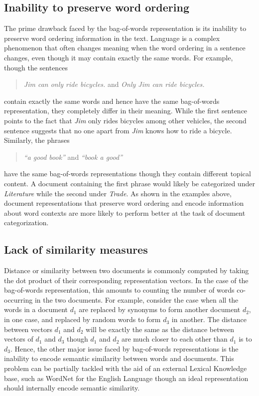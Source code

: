 \subsection{Inability to preserve word ordering}
The prime drawback faced by the bag-of-words representation is its 
inability to preserve word ordering information in the text. Language 
is a complex phenomenon that often changes meaning when the word 
ordering in a sentence changes, even though it may contain exactly the 
same words. For example,  though the sentences
\begin{quote}
\centering
\emph{ 	Jim can only ride bicycles. } and \emph{ 	Only Jim can ride bicycles. }
\end{quote}
contain exactly the same words and hence have the same bag-of-words representation, they completely differ in their meaning. While the first sentence points to the fact that \emph{Jim} only rides bicycles among other vehicles, the second sentence suggests that no one apart from \emph{Jim} knows how to ride a bicycle. 
Similarly, the phrases 
\begin{quote}
\centering
\emph{ 	``a good book'' } and \emph{ 	``book a good'' }
\end{quote}
have the same bag-of-words representations though they contain different topical content. A document containing the first phrase would likely be categorized under \emph{Literature} while the second under \emph{Trade}.
As shown in the examples above, document representations that preserve word ordering and encode information about 
word contexts are more likely to perform better at the task of document categorization.

\subsection{Lack of similarity measures}
Distance or similarity between two documents is commonly computed by 
taking the dot product of their corresponding representation vectors. 
In the case of the bag-of-words representation, this amounts to counting 
the number of words co-occurring in the two documents. For example, 
consider the case when all the words in a document $d_{1}$ are 
replaced by synonyms to form another document $d_{2}$, in one case, 
and replaced by random words to form $d_{3}$ in another. The distance 
between vectors $d_{1}$ and $d_{2}$ will be exactly the same as the 
distance between vectors of $d_{1}$ and $d_{3}$ though $d_{1}$ and 
$d_{2}$ are much closer to each other than $d_1$ is to $d_{3}$. 
Hence, the other major issue faced by bag-of-words representations 
is the inability to encode semantic similarity between words and documents. 
This problem can be partially tackled with the aid of an external Lexical Knowledge base, such as WordNet for the English Language though an ideal representation should internally encode semantic similarity.

